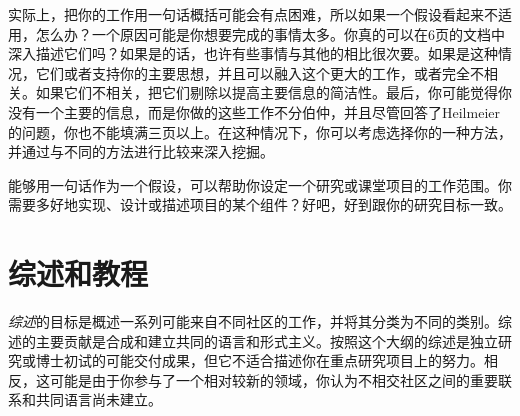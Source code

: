 实际上，把你的工作用一句话概括可能会有点困难，所以如果一个假设看起来不适用，怎么办？一个原因可能是你想要完成的事情太多。你真的可以在6页的文档中深入描述它们吗？如果是的话，也许有些事情与其他的相比很次要。如果是这种情况，它们或者支持你的主要思想，并且可以融入这个更大的工作，或者完全不相关。如果它们不相关，把它们剔除以提高主要信息的简洁性。最后，你可能觉得你没有一个主要的信息，而是你做的这些工作不分伯仲，并且尽管回答了Heilmeier的问题，你也不能填满三页以上。在这种情况下，你可以考虑选择你的一种方法，并通过与不同的方法进行比较来深入挖掘。


能够用一句话作为一个假设，可以帮助你设定一个研究或课堂项目的工作范围。你需要多好地实现、设计或描述项目的某个组件？好吧，好到跟你的研究目标一致。


\section{综述和教程}
\emph{综述}的目标是概述一系列可能来自不同社区的工作，并将其分类为不同的类别。综述的主要贡献是合成和建立共同的语言和形式主义。按照这个大纲的综述是独立研究或博士初试的可能交付成果，但它不适合描述你在重点研究项目上的努力。相反，这可能是由于你参与了一个相对较新的领域，你认为不相交社区之间的重要联系和共同语言尚未建立。


